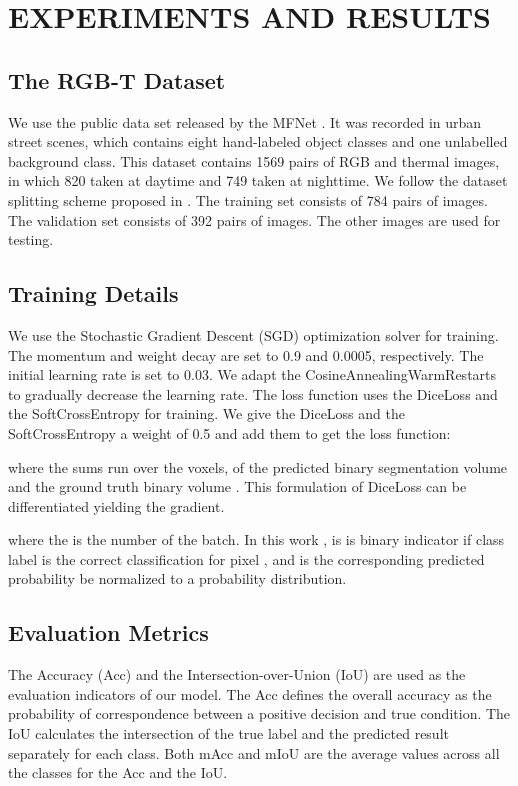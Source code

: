 \documentclass[letterpaper, 10 pt, conference]{ieeeconf}  \usepackage{graphicx}
\begin{document}
\section{EXPERIMENTS AND RESULTS}

\subsection{The RGB-T Dataset}

We use the public data set released by the MFNet \cite{ha2017mfnet}. It was recorded in urban street scenes, which contains eight hand-labeled object classes and one unlabelled background class. This dataset contains 1569 pairs of RGB and thermal images, in which 820 taken at daytime and 749 taken at nighttime. We follow the dataset splitting scheme proposed in \cite{ha2017mfnet}. The training set consists of 784 pairs of images. The validation set consists of 392 pairs of images. The other images are used for testing.

\subsection{Training Details}

We use the Stochastic Gradient Descent (SGD) optimization solver for training. The momentum and weight decay are set to 0.9 and 0.0005, respectively. The initial learning rate is set to 0.03. We adapt the CosineAnnealingWarmRestarts \cite{loshchilov2017decoupled} to gradually decrease the learning rate. The loss function uses the DiceLoss \cite{milletari2016v} and the SoftCrossEntropy \cite{yi2019probabilistic} for training. We give the DiceLoss and the SoftCrossEntropy a weight of 0.5 and add them to get the loss function:


where the sums run over the  voxels, of the predicted binary segmentation volume  and the ground truth binary volume . This formulation of DiceLoss can be differentiated yielding the gradient.


where the  is the number of the batch. In this work ,  is is binary indicator if class label  is the correct classification for pixel , and  is the corresponding predicted probability be normalized to a probability distribution.


\subsection{Evaluation Metrics}
The Accuracy (Acc) and the Intersection-over-Union (IoU) are used as the evaluation indicators of our model. The Acc defines the overall accuracy as the probability of correspondence between a positive decision and true condition. The IoU calculates the intersection of the true label and the predicted result separately for each class. Both mAcc and mIoU are the average values across all the classes for the Acc and the IoU.
\end{document}

